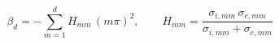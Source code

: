 $$
\beta_d = -\sum_{m=1}^{d} H_{mm}\,(m\pi)^2,\qquad H_{mm} = \frac{\sigma_{i,mm}\,\sigma_{e,mm}}{\sigma_{i,mm}+\sigma_{e,mm}}
$$
